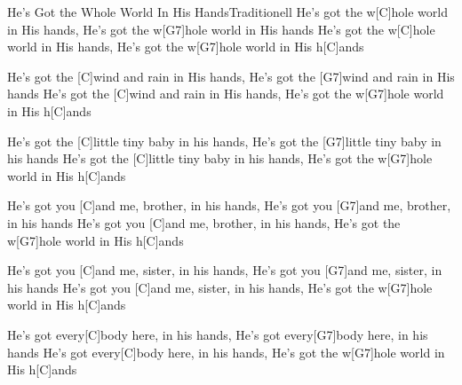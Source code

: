 \documentclass[../main.tex]{subfiles}
\begin{document}
\begin{song}{He's Got the Whole World In His Hands}{Traditionell}{}
He's got the w[C]hole world in His hands, He's got the w[G7]hole world in His hands
He's got the w[C]hole world in His hands, He's got the w[G7]hole world in His h[C]ands

He's got the [C]wind and rain in His hands, He's got the [G7]wind and rain in His hands
He's got the [C]wind and rain in His hands, He's got the w[G7]hole world in His h[C]ands

He's got the [C]little tiny baby in his hands, He's got the [G7]little tiny baby in his hands
He's got the [C]little tiny baby in his hands, He's got the w[G7]hole world in His h[C]ands

He's got you [C]and me, brother, in his hands, He's got you [G7]and me, brother, in his hands
He's got you [C]and me, brother, in his hands, He's got the w[G7]hole world in His h[C]ands

He's got you [C]and me, sister, in his hands, He's got you [G7]and me, sister, in his hands
He's got you [C]and me, sister, in his hands, He's got the w[G7]hole world in His h[C]ands

He's got every[C]body here, in his hands, He's got every[G7]body here, in his hands
He's got every[C]body here, in his hands, He's got the w[G7]hole world in His h[C]ands
\end{song}
\end{document}

